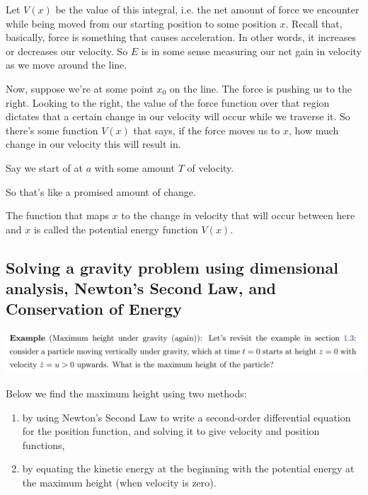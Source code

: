 Let $V(x)$ be the value of this integral, i.e. the net amount of force we encounter while being
moved from our starting position to some position $x$. Recall that, basically, force is something
that causes acceleration. In other words, it increases or decreases our velocity. So $E$ is in some
sense measuring our net gain in velocity as we move around the line.

Now, suppose we're at some point $x_0$ on the line. The force is pushing us to the right. Looking to
the right, the value of the force function over that region dictates that a certain change in our
velocity will occur while we traverse it. So there's some function $V(x)$ that says, if the force
moves us to $x$, how much change in our velocity this will result in.

Say we start of at $a$ with some amount $T$ of velocity.

So that's like a promised amount of
change.


The function that maps $x$ to the
change in velocity that will occur between here and $x$ is called the potential energy function
$V(x)$.

\subsection{Solving a gravity problem using dimensional analysis, Newton's Second Law, and Conservation of Energy}

\begin{mdframed}
  \includegraphics[width=400pt]{img/physics--classical-mechanics--oxford--dynamics--example--gravity.png}
\end{mdframed}

Below we find the maximum height using two methods:
\begin{enumerate}
\item by using Newton's Second Law to write a second-order differential equation for the position
  function, and solving it to give velocity and position functions,
\item by equating the kinetic energy at the beginning with the potential energy at the maximum
  height (when velocity is zero).
\end{enumerate}

